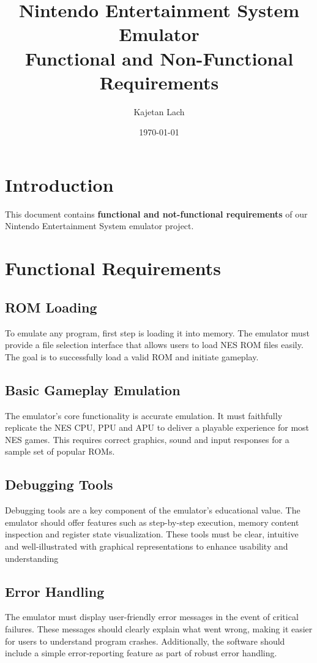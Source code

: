 \documentclass[a4paper, 11pt]{article}
\title{%
\vspace{-2.5cm}
\textbf{Nintendo Entertainment System Emulator}\\
Functional and Non-Functional Requirements
}
\date{\today}
\author{Kajetan Lach}
\begin{document}
\maketitle

\section{Introduction}
This document contains \textbf{functional and not-functional requirements} of our Nintendo Entertainment System emulator project.

\section{Functional Requirements}

\subsection{ROM Loading}
To emulate any program, first step is loading it into memory. The emulator must provide a file selection interface that allows users to load NES ROM files easily. The goal is to successfully load a valid ROM and initiate gameplay.

\subsection{Basic Gameplay Emulation}
The emulator's core functionality is accurate emulation. It must faithfully replicate the NES CPU, PPU and APU to deliver a playable experience for most NES games. This requires correct graphics, sound and input responses for a sample set of popular ROMs.

\subsection{Debugging Tools}
Debugging tools are a key component of the emulator's educational value. The emulator should offer features such as step-by-step execution, memory content inspection and register state visualization. These tools must be clear, intuitive and well-illustrated with graphical representations to enhance usability and understanding 

\subsection{Error Handling}
The emulator must display user-friendly error messages in the event of critical failures. These messages should clearly explain what went wrong, making it easier for users to understand program crashes. Additionally, the software should include a simple error-reporting feature as part of robust error handling.
\end{document}
